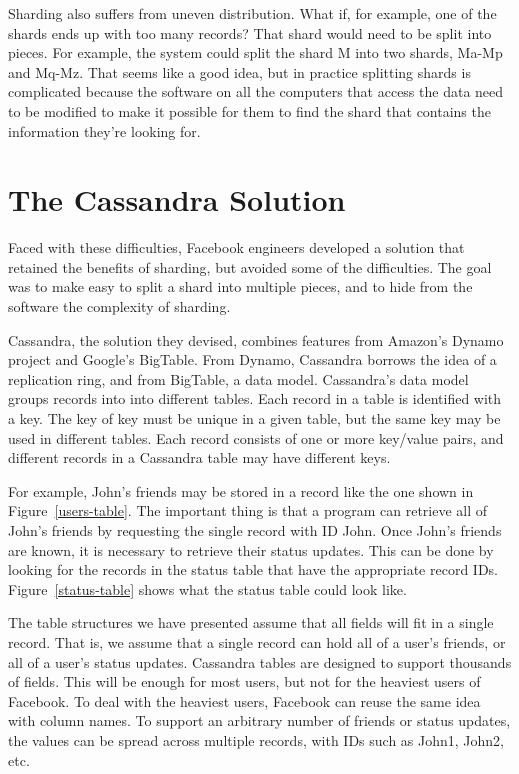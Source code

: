 Sharding also suffers from uneven distribution.
What if, for example, one of the shards ends up with too many records?
That shard would need to be split into pieces.
For example, the system could
split the shard M into two shards, Ma-Mp and Mq-Mz.
That seems like a good idea, but in practice splitting shards
is complicated because the software on all the computers that access the data
need to be modified to make it possible for them
to find the shard that contains the information they're looking for.

\section{The Cassandra Solution}

Faced with these difficulties, Facebook engineers developed a solution that
retained the benefits of sharding, but avoided some of the difficulties.
The goal was to make easy to split a shard into multiple pieces,
and to hide from the software the complexity of sharding.

Cassandra, the solution they devised, combines features
from Amazon's Dynamo project and Google's BigTable.
From Dynamo, Cassandra borrows the idea of a replication ring,
and from BigTable, a data model.
Cassandra's data model groups records into into different tables.
Each record in a table is identified with a key.
The key of key must be unique in a given table, but the same key may be used in different tables.
Each record consists of one or more key/value pairs, and
different records in a Cassandra table may have different keys.

For example, John's friends may be stored in a record like the one shown in Figure~\ref{users-table}.
The important thing is that a program can retrieve
all of John's friends by requesting the single record with ID John.
Once John's friends are known, it is necessary to retrieve their status updates.
This can be done by looking for the records in the status table that have the appropriate record IDs.
Figure~\ref{status-table} shows what the status table could look like.

The table structures we have presented assume that all fields will fit in a single record.
That is, we assume that a single record can hold all of a user's friends, or all of a user's status updates.
Cassandra tables are designed to support thousands of fields.
This will be enough for most users, but not for the heaviest users of Facebook.
To deal with the heaviest users, Facebook can reuse the same idea with column names.
To support an arbitrary number of friends or status updates,
the values can be spread across multiple records, with IDs such as John1, John2, etc.

